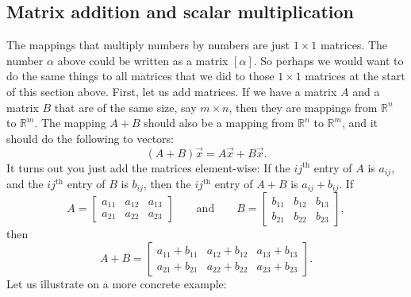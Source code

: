 \documentclass{ximera}
\begin{document}
\subsection{Matrix addition and scalar multiplication}

The mappings that multiply numbers by numbers are just $1 \times 1$ matrices. The number $\alpha$ above could be written as a matrix $[\alpha]$. So perhaps we would want to do the same things to all matrices that we did to those $1 \times 1$ matrices at the start of this section above. First, let us add matrices. If we have a matrix $A$ and a matrix $B$ that are of the same size, say $m \times n$, then they are mappings from ${\mathbb{R}}^n$ to ${\mathbb{R}}^m$.  The mapping $A+B$ should also be a mapping from ${\mathbb{R}}^n$ to ${\mathbb{R}}^m$, and it should do the following to vectors:
\begin{equation*}
    (A+B) \vec{x} = A\vec{x} + B \vec{x} .
\end{equation*}
It turns out you just add the matrices element-wise:  If the $ij^{\text{th}}$ entry of $A$ is $a_{ij}$, and the $ij^{\text{th}}$ entry of $B$ is $b_{ij}$, then the $ij^{\text{th}}$ entry of $A+B$ is $a_{ij} + b_{ij}$.  If
\begin{equation*}
    A = 
    \begin{bmatrix}
        a_{11} & a_{12} & a_{13}  \\
        a_{21} & a_{22} & a_{23}
    \end{bmatrix}
    \qquad \text{and} \qquad B = 
    \begin{bmatrix}
        b_{11} & b_{12} & b_{13}  \\
        b_{21} & b_{22} & b_{23}
    \end{bmatrix} ,
\end{equation*}
then
\begin{equation*}
    A+B = 
    \begin{bmatrix}
        a_{11} + b_{11} & a_{12} + b_{12} & a_{13} + b_{13}  \\
        a_{21} + b_{21} & a_{22} + b_{22} & a_{23} + b_{23}
    \end{bmatrix} .
\end{equation*}
Let us illustrate on a more concrete example:
\end{document}
